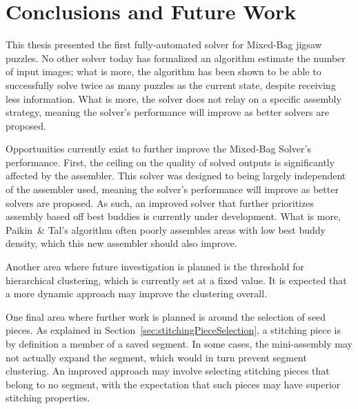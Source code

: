 \chapter{Conclusions and Future Work}

This thesis presented the first fully-automated solver for Mixed-Bag jigsaw puzzles.  No other solver today has formalized an algorithm estimate the number of input images; what is more, the algorithm has been shown to be able to successfully solve twice as many puzzles as the current state, despite receiving less information.  What is more, the solver does not relay on a specific assembly strategy, meaning the solver's performance will improve as better solvers are proposed. 

Opportunities currently exist to further improve the Mixed-Bag Solver's performance.  First, the ceiling on the quality of solved outputs is significantly affected by the assembler.  This solver was designed to being largely independent of the assembler used, meaning the solver's performance will improve as better solvers are proposed. As such, an improved solver that further prioritizes assembly based off best buddies is currently under development.  What is more, Paikin~\& Tal's algorithm often poorly assembles areas with low best buddy density, which this new assembler should also improve.

Another area where future investigation is planned is the threshold for hierarchical clustering, which is currently set at a fixed value.  It is expected that a more dynamic approach may improve the clustering overall.

One final area where further work is planned is around the selection of seed pieces.  As explained in Section~\ref{sec:stitchingPieceSelection}, a stitching piece is by definition a member of a saved segment.  In some cases, the mini-assembly may not actually expand the segment, which would in turn prevent segment clustering. An improved approach may involve selecting stitching pieces that belong to no segment, with the expectation that such pieces may have superior stitching properties.
